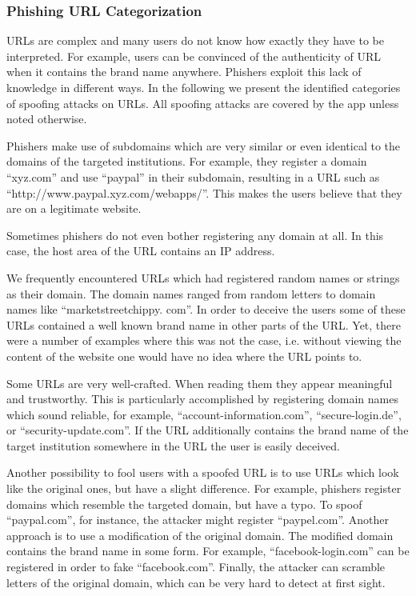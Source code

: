 \subsubsection{Phishing URL Categorization}
\label{s:url_categories}
URLs are complex and many users do not know how exactly they have to be interpreted.
 For example, users can be convinced of the authenticity of URL when it contains the brand name anywhere.
 Phishers exploit this lack of knowledge in different ways.
 In the following we present the identified categories of spoofing attacks on URLs. 
 All spoofing attacks are covered by the app unless noted otherwise.

\begin{description}[leftmargin=0cm]
	\item[Subdomain] Phishers make use of subdomains which are very similar or even identical to the domains of the targeted institutions.
 For example, they register a domain  ``xyz.com'' and use ``paypal'' in their subdomain, resulting in a URL such as ``http://www.paypal.xyz.com/webapps/''.
 This makes the users believe that they are on a legitimate website.

	\item[IP Address] Sometimes phishers do not even bother registering any domain at all.
 In this case, the host area of the URL contains an IP address.

	\item[Nonsense Domain] We frequently encountered URLs which had registered random names or strings as their domain.
 The domain names ranged from random letters to domain names like ``marketstreetchippy.
com''. In order to deceive the users some of these URLs contained a well known brand name in other parts of the URL.
Yet, there were a number of examples where this was not the case, i.e. without viewing the content of the website one would have no idea where the URL points to.

	\item[Trustworthy, but Unrelated Domain] Some URLs are very well-crafted.
 When reading them they appear meaningful and trustworthy.
 This is particularly accomplished by registering domain names which sound reliable, for example, ``account-information.com'', ``secure-login.de'', or ``security-update.com''. If the URL additionally contains the brand name of the target institution somewhere in the URL the user is easily deceived.

	\item[Similar and Deceptive Domains] Another possibility to fool users with a spoofed URL is to use URLs which look like the original ones, but have a slight difference.
 For example, phishers register domains which resemble the targeted domain, but have a typo.
 To spoof ``paypal.com'', for instance, the attacker might register ``paypel.com''. Another approach is to use a modification of the original domain.
 The modified domain contains the brand name in some form.
 For example, ``facebook-login.com'' can be registered in order to fake ``facebook.com''. Finally, the attacker can scramble letters of the original domain, which can be very hard to detect at first sight.


\end{description}
